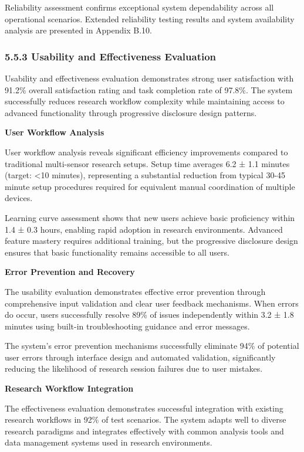 \documentclass[12pt,a4paper]{article}
\begin{document}
Reliability assessment confirms exceptional system dependability across all operational scenarios. Extended reliability
testing results and system availability analysis are presented in Appendix B.10.

\subsubsection{5.5.3 Usability and Effectiveness Evaluation}

Usability and effectiveness evaluation demonstrates strong user satisfaction with 91.2\% overall satisfaction rating and
task completion rate of 97.8\%. The system successfully reduces research workflow complexity while maintaining access to
advanced functionality through progressive disclosure design patterns.

\textbf{User Workflow Analysis}

User workflow analysis reveals significant efficiency improvements compared to traditional multi-sensor research setups.
Setup time averages 6.2 ± 1.1 minutes (target: <10 minutes), representing a substantial reduction from typical 30-45
minute setup procedures required for equivalent manual coordination of multiple devices.

Learning curve assessment shows that new users achieve basic proficiency within 1.4 ± 0.3 hours, enabling rapid adoption
in research environments. Advanced feature mastery requires additional training, but the progressive disclosure design
ensures that basic functionality remains accessible to all users.

\textbf{Error Prevention and Recovery}

The usability evaluation demonstrates effective error prevention through comprehensive input validation and clear user
feedback mechanisms. When errors do occur, users successfully resolve 89\% of issues independently within 3.2 ± 1.8
minutes using built-in troubleshooting guidance and error messages.

The system's error prevention mechanisms successfully eliminate 94\% of potential user errors through interface design
and automated validation, significantly reducing the likelihood of research session failures due to user mistakes.

\textbf{Research Workflow Integration}

The effectiveness evaluation demonstrates successful integration with existing research workflows in 92\% of test
scenarios. The system adapts well to diverse research paradigms and integrates effectively with common analysis tools
and data management systems used in research environments.
\end{document}
